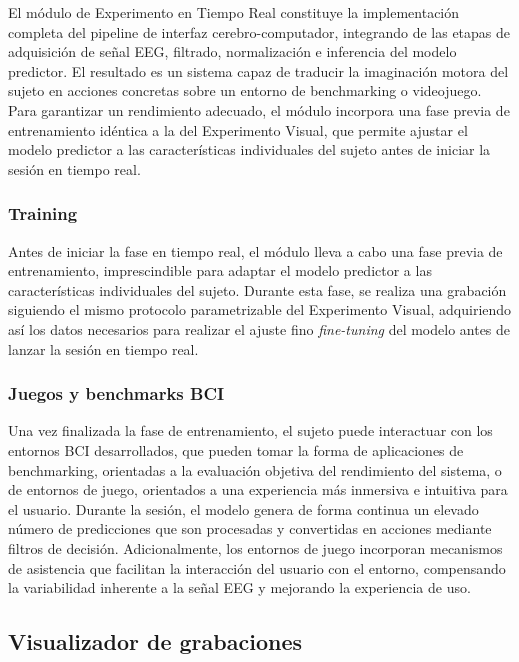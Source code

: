 El módulo de Experimento en Tiempo Real constituye la implementación completa del pipeline de interfaz cerebro-computador, integrando de las etapas de adquisición de señal EEG, filtrado, normalización e inferencia del modelo predictor. El resultado es un sistema capaz de traducir la imaginación motora del sujeto en acciones concretas sobre un entorno de benchmarking o videojuego. Para garantizar un rendimiento adecuado, el módulo incorpora una fase previa de entrenamiento idéntica a la del Experimento Visual, que permite ajustar el modelo predictor a las características individuales del sujeto antes de iniciar la sesión en tiempo real.

\subsubsection{Training}
\label{subsubsec:training}

Antes de iniciar la fase en tiempo real, el módulo lleva a cabo una fase previa de entrenamiento, imprescindible para adaptar el modelo predictor a las características individuales del sujeto. Durante esta fase, se realiza una grabación siguiendo el mismo protocolo parametrizable del Experimento Visual, adquiriendo así los datos necesarios para realizar el ajuste fino \textit{fine-tuning} del modelo antes de lanzar la sesión en tiempo real.

\subsubsection{Juegos y benchmarks BCI}
\label{subsubsec:juegosBCI}

Una vez finalizada la fase de entrenamiento, el sujeto puede interactuar con los entornos BCI desarrollados, que pueden tomar la forma de aplicaciones de benchmarking, orientadas a la evaluación objetiva del rendimiento del sistema, o de entornos de juego, orientados a una experiencia más inmersiva e intuitiva para el usuario. Durante la sesión, el modelo genera de forma continua un elevado número de predicciones que son procesadas y convertidas en acciones mediante filtros de decisión. Adicionalmente, los entornos de juego incorporan mecanismos de asistencia que facilitan la interacción del usuario con el entorno, compensando la variabilidad inherente a la señal EEG y mejorando la experiencia de uso.

\subsection{Visualizador de grabaciones}
\label{subsec:visualizadorGrabaciones}

